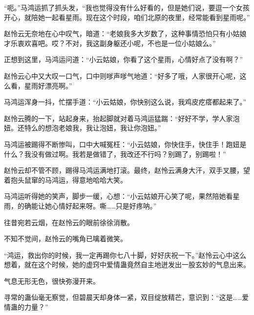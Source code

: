 \begin{this_body}
“呃。”马鸿运抓了抓头发，“我也觉得没有什么好看的，但是她们说，要逗一个女孩开心，就陪她一起看星雨。现在这个时段，咱们北原的夜里，经常能看到星雨呢。”

赵怜云无奈地在心中叹气，暗道：“老娘我多大岁数了，这种事情恐怕只有小姑娘才乐衷欢喜吧。哎？不对，我这副身躯还小呢，不也是一位小姑娘么。”

正想到这里，马鸿运问道：“小云姑娘，你看了这个星雨，心情好点了没有啊？”

赵怜云心中又大叹一口气，口中则嗲声嗲气地道：“好多了哦，人家很开心呢，这么看，星雨好漂亮啊。”

马鸿运浑身一抖，忙摆手道：“小云姑娘，你快别这么说，我鸡皮疙瘩都起来了。”

赵怜云腾的一下，站起身来，抬起脚就对着马鸿运猛踹：“好好不学，学人家泡妞。还特么的想泡老娘我，我让泡妞，我让你泡妞。”

马鸿运被踢得不断惨叫，口中大喊冤枉：“小云姑娘，你快住手，快住手！跑妞是什么？我没有做过啊。我若是做错了，我改还不行吗？别踢了，别踢啦！”

赵怜云却不管不顾，踢得马鸿运满地打滚。最终，赵怜云满身大汗，双手叉腰，望着抱头鼠窜的马鸿运，得意地哈哈大笑。

马鸿运听得她的笑声，脚步一缓，心想：“小云姑娘开心笑了呢，果然陪她看星雨，的确能让她心情好起来呀。嘶……只是好疼呐。”

往昔宛若云烟，在赵怜云的眼前徐徐消散。

不知不觉间，赵怜云的嘴角已噙着微笑。

“鸿运，救出你的时候，我一定再踢你七八十脚，好好庆祝一下。”赵怜云心中这么想着，就在这个时候，她的虚窍中爱情蛊竟然自主地迸发出一股玄妙的气息出来。

气息无形无色，很快弥漫开来。

寻常的蛊仙毫无察觉，但碧晨天却身体一紧，双目绽放精芒，意识到：“这是……爱情蛊的力量？”

\end{this_body}

